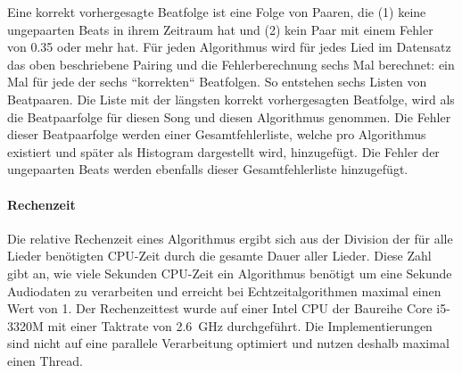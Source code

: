 {{{			%
			Eine korrekt vorhergesagte Beatfolge ist eine Folge von Paaren,
				die (1) keine ungepaarten Beats in ihrem Zeitraum hat und
				(2) kein Paar mit einem Fehler von \num{0.35} oder mehr hat.
			Für jeden Algorithmus wird für jedes Lied im Datensatz das oben beschriebene Pairing und die Fehlerberechnung
				sechs Mal berechnet:
				ein Mal für jede der sechs ``korrekten`` Beatfolgen.
			So entstehen sechs Listen von Beatpaaren.
			Die Liste mit der längsten korrekt vorhergesagten Beatfolge,
				wird als die Beatpaarfolge für diesen Song und diesen Algorithmus genommen.
			Die Fehler dieser Beatpaarfolge werden einer Gesamtfehlerliste,
				welche pro Algorithmus existiert und später als Histogram dargestellt wird,
				hinzugefügt.
			Die Fehler der ungepaarten Beats werden ebenfalls dieser Gesamtfehlerliste hinzugefügt.
		}

		\paragraph{Rechenzeit}
		{
			Die relative Rechenzeit eines Algorithmus ergibt sich aus der Division der für alle Lieder benötigten CPU-Zeit durch die gesamte Dauer aller Lieder.
			Diese Zahl gibt an,
				wie viele Sekunden CPU-Zeit ein Algorithmus benötigt um eine Sekunde Audiodaten zu verarbeiten
				und erreicht bei Echtzeitalgorithmen maximal einen Wert von \num{1}.
			Der Rechenzeittest wurde auf einer Intel CPU der Baureihe Core i5-3320M mit einer Taktrate von \SI{2.6}{\giga\hertz} durchgeführt.
			Die Implementierungen sind nicht auf eine parallele Verarbeitung optimiert
				und nutzen deshalb maximal einen Thread.
		}
	}
}
